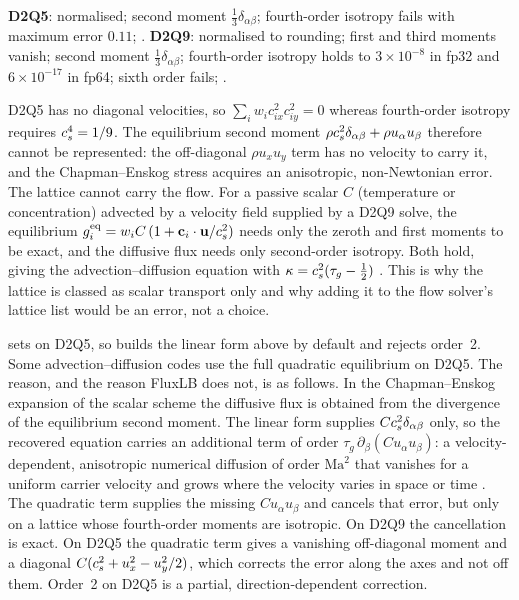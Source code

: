 \begin{verified}
\textbf{D2Q5}: normalised; second moment $\tfrac{1}{3}\delta_{\alpha\beta}$; fourth-order
isotropy fails with maximum error $0.11$; .
\textbf{D2Q9}: normalised to rounding; first and third moments vanish; second moment
$\tfrac13\delta_{\alpha\beta}$; fourth-order isotropy holds to $3\times10^{-8}$ in fp32 and
$6\times10^{-17}$ in fp64; sixth order fails; .
\end{verified}

D2Q5 has no diagonal velocities, so $\sum_i w_i c_{ix}^2 c_{iy}^2 = 0$ whereas fourth-order
isotropy requires $c_s^4 = 1/9$. The equilibrium second moment $\rho c_s^2\delta_{\alpha\beta}
+ \rho u_\alpha u_\beta$ therefore cannot be represented: the off-diagonal $\rho u_x u_y$
term has no velocity to carry it, and the Chapman--Enskog stress acquires an anisotropic,
non-Newtonian error. The lattice cannot carry the flow. For a passive scalar $C$ (temperature
or concentration) advected by a velocity field supplied by a D2Q9 solve, the equilibrium
$g_i^{\mathrm{eq}} = w_i C\,(1 + \mathbf{c}_i\cdot\mathbf{u}/c_s^2)$ needs only the zeroth and first
moments to be exact, and the diffusive flux needs only second-order isotropy. Both hold,
giving the advection--diffusion equation with $\kappa = c_s^2(\tau_g - \tfrac12)$
\parencite{Kruger2017}. This is why the lattice is classed as scalar transport only and why
adding it to the flow solver's lattice list would be an error, not a choice.

 sets  on D2Q5, so 
builds the linear form above by default and rejects order~2. Some advection--diffusion
codes use the full quadratic equilibrium on D2Q5. The reason, and the reason FluxLB does
not, is as follows. In the Chapman--Enskog expansion of the scalar scheme the diffusive
flux is obtained from the divergence of the equilibrium second moment. The linear form
supplies $Cc_s^2\delta_{\alpha\beta}$ only, so the recovered equation carries an additional
term of order $\tau_g\,\partial_\beta(C u_\alpha u_\beta)$: a velocity-dependent,
anisotropic numerical diffusion of order $\mathrm{Ma}^2$ that vanishes for a uniform carrier
velocity and grows where the velocity varies in space or time
\parencite{Chopard2009,Kruger2017}. The quadratic term supplies the missing
$C u_\alpha u_\beta$ and cancels that error, but only on a lattice whose fourth-order
moments are isotropic. On D2Q9 the cancellation is exact. On D2Q5 the quadratic term gives a
vanishing off-diagonal moment and a diagonal $C(c_s^2 + u_x^2 - u_y^2/2)$, which corrects
the error along the axes and not off them. Order~2 on D2Q5 is a partial,
direction-dependent correction.

